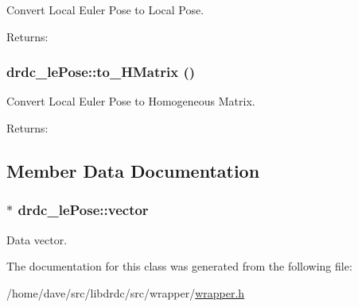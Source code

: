 Convert Local Euler Pose to Local Pose. 

\begin{Desc}
\item[Returns:]\end{Desc}
\hypertarget{classdrdc__lePose_6d38322461e79058e87eccd77b3259b6}{
\subsubsection[to\_\-HMatrix]{ drdc\_\-lePose::to\_\-HMatrix ()}}
\label{classdrdc__lePose_6d38322461e79058e87eccd77b3259b6}


Convert Local Euler Pose to Homogeneous Matrix. 

\begin{Desc}
\item[Returns:]\end{Desc}


\subsection{Member Data Documentation}
\hypertarget{classdrdc__lePose_a9f132c5bcd64f4d09aed98b9c25ef53}{
\subsubsection[vector]{$\ast$ {\bf drdc\_\-lePose::vector}}}
\label{classdrdc__lePose_a9f132c5bcd64f4d09aed98b9c25ef53}


Data vector. 



The documentation for this class was generated from the following file:\begin{CompactItemize}
\item 
/home/dave/src/libdrdc/src/wrapper/\hyperlink{wrapper_8h}{wrapper.h}\end{CompactItemize}
